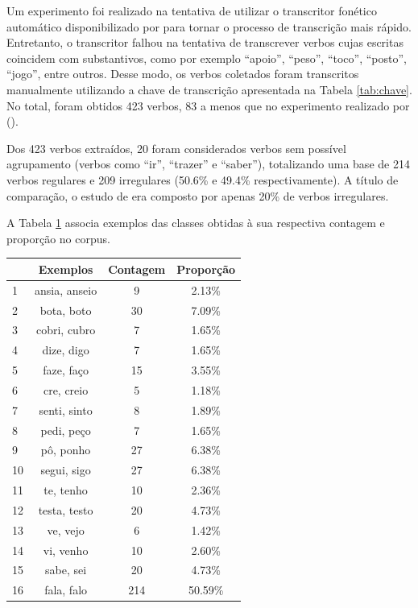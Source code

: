  Um experimento foi realizado na tentativa de utilizar o transcritor fonético automático disponibilizado por \cite{guide:2016} para tornar o processo de transcrição mais rápido. Entretanto, o transcritor falhou na tentativa de transcrever verbos cujas escritas coincidem com substantivos, como por exemplo “apoio”, “peso”, “toco”, “posto”, “jogo”, entre outros. Desse modo, os verbos coletados foram transcritos manualmente utilizando a chave de transcrição apresentada na Tabela \ref{tab:chave}. No total, foram obtidos 423 verbos, 83 a menos que no experimento realizado por (\cite{rumelhart:1986}).

Dos 423 verbos extraídos, 20 foram considerados verbos sem possível agrupamento (verbos como “ir”, “trazer” e “saber”), totalizando uma base de 214 verbos regulares e 209 irregulares (50.6\% e 49.4\% respectivamente). A título de comparação, o estudo de \cite{rumelhart:1986} era composto por apenas 20\% de verbos irregulares.

A Tabela \ref{tab:classes} associa exemplos das classes obtidas à sua respectiva contagem e proporção no corpus.

\begin{table}[H]
\begin{center}
\begin{tabular}{|l|c|c|c|}
\toprule
 & Exemplos & Contagem & Proporção\\
\midrule
1  & ansia, anseio & 9 & 2.13\%\\
2  & bota, boto & 30 & 7.09\%\\
3  & cobri, cubro & 7 & 1.65\%\\
4  & dize, digo & 7 & 1.65\%\\
5 & faze, faço & 15 & 3.55\%\\
6  & cre, creio & 5 & 1.18\%\\
7  & senti, sinto & 8 & 1.89\% \\
8  & pedi, peço & 7 & 1.65\%\\
9  & pô, ponho & 27 & 6.38\%\\
10  & segui, sigo & 27 & 6.38\%\\
11  & te, tenho & 10 & 2.36\%\\
12  & testa, testo & 20 & 4.73\%\\
13  & ve, vejo & 6 & 1.42\%\\
14  & vi, venho & 10 & 2.60\%\\
15 & sabe, sei & 20 & 4.73\%\\
16  & fala, falo & 214 & 50.59\%\\
\bottomrule
\end{tabular}
\end{center}
\label{tab:classes}
\end{table}

